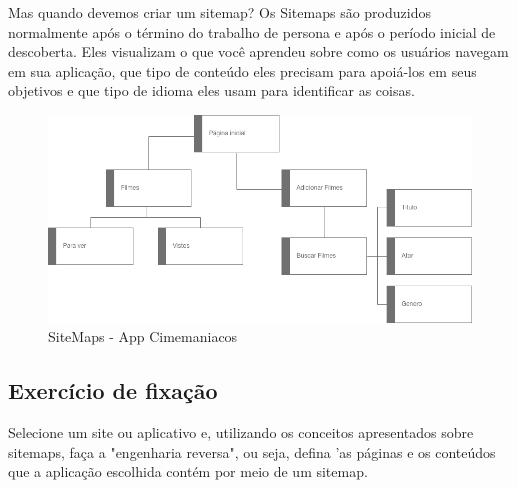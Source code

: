 Mas quando devemos criar um sitemap? Os Sitemaps são produzidos normalmente após o término do trabalho de persona e após o período inicial de descoberta. Eles visualizam o que você aprendeu sobre como os usuários navegam em sua aplicação, que tipo de conteúdo eles precisam para apoiá-los em seus objetivos e que tipo de idioma eles usam para identificar as coisas.

\begin{figure}[H]
	\centering
	\includegraphics[scale=0.4]{imagens/sitemap.jpg}
	\caption{SiteMaps - App Cimemaniacos}
\end{figure}

\subsection{Exercício de fixação}

Selecione um site ou aplicativo e, utilizando os conceitos apresentados sobre sitemaps, faça a "engenharia reversa", ou seja, defina 'as páginas e os conteúdos que a aplicação escolhida contém por meio de um sitemap.


